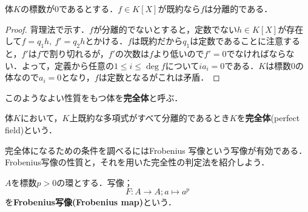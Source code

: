 \begin{thm}
	体$K$の標数が0であるとする．$f\in K[X]$が既約なら$f$は分離的である．
\end{thm}
\begin{proof}
	背理法で示す．$f$が分離的でないとすると，定数でない$h\in K[X]$が存在して$f=q_1h,~f'=q_2h$とかける．$f$は既約だから$q_1$は定数であることに注意すると，$f'$は$f$で割り切れるが，$f'$の次数は$f$より低いので$f'=0$でなければならない．よって，定義から任意の$1\leq i\leq\deg{f}$について$ia_i=0$である．$K$は標数0の体なので$a_i=0$となり，$f$は定数となるがこれは矛盾．
\end{proof}

このようなよい性質をもつ体を\textbf{完全体}と呼ぶ．
\begin{defi}[完全体]
	体$K$において，$K$上既約な多項式がすべて分離的であるとき$K$を\textbf{完全体}(perfect field)という．
\end{defi}

完全体になるための条件を調べるにはFrobenius 写像という写像が有効である．Frobenius写像の性質と，それを用いた完全性の判定法を紹介しよう．
\begin{defi}[Frobenius写像]
	$A$を標数$p>0$の環とする．写像；
	\[F:A\longrightarrow A;a\longmapsto a^p\]
	を\textbf{Frobenius写像(Frobenius map)}という．
\end{defi}

